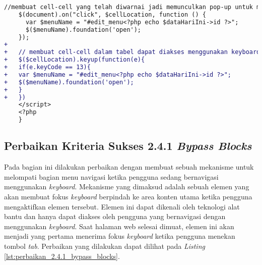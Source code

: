 \begin{itemize}
\begin{lstlisting}[frame=single, label={lst:perbaikan_2.1.1_keyboard_entri_jadwal_dosen}, language=diff, caption=Perbaikan Kriteria Sukses 2.1.1 pada Halaman Entri Jadwal Dosen]
    //membuat cell-cell yang telah diwarnai jadi memunculkan pop-up untuk mengedit jadwal ketika diklik oleh mouse
    $(document).on("click", $cellLocation, function () {
      var $menuName = "#edit_menu<?php echo $dataHariIni->id ?>";
      $($menuName).foundation('open');
    });
+
+   // membuat cell-cell dalam tabel dapat diakses menggunakan keyboard
+   $($cellLocation).keyup(function(e){
+   if(e.keyCode == 13){
+   var $menuName = "#edit_menu<?php echo $dataHariIni->id ?>";
+   $($menuName).foundation('open');
+   }
+   })
    </script>
    <?php
    }
\end{lstlisting}
\end{itemize}

\subsection{Perbaikan Kriteria Sukses 2.4.1 \textit{Bypass Blocks}}
\label{subsec:perbaikan_kriteria_sukses_2.4.1}
Pada bagian ini dilakukan perbaikan dengan membuat sebuah mekanisme untuk melompati bagian menu navigasi ketika pengguna sedang bernavigasi menggunakan \textit{keyboard}. Mekanisme yang dimaksud adalah sebuah elemen yang akan membuat fokus \textit{keyboard} berpindah ke area konten utama ketika pengguna mengaktifkan elemen tersebut. Elemen ini dapat dikenali oleh teknologi alat bantu dan hanya dapat diakses oleh pengguna yang bernavigasi dengan menggunakan \textit{keyboard}. Saat halaman web selesai dimuat, elemen ini akan menjadi yang pertama menerima fokus \textit{keyboard} ketika pengguna menekan tombol \textit{tab}. Perbaikan yang dilakukan dapat dilihat pada \textit{Listing} \ref{lst:perbaikan_2.4.1_bypass_blocks}.
